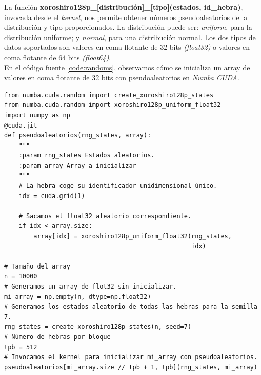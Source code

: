 La función \textbf{xoroshiro128p\_[distribución]\_[tipo](estados, id\_hebra)}, invocada desde el \textit{kernel}, nos permite obtener números pseudoaleatorios de la distribución y tipo proporcionados. La distribución puede ser: \textit{uniform}, para la distribución uniforme; y \textit{normal}, para una distribución normal. Los dos tipos de datos soportados son valores en coma flotante de 32 bits \textit{(float32)} o valores en coma flotante de 64 bits \textit{(float64)}. \\

En el código fuente \ref{code:randoms}, observamos cómo se inicializa un array de valores en coma flotante de 32 bits con pseudoaleatorios en \textit{Numba CUDA}.

\begin{code}
\begin{verbatim}
from numba.cuda.random import create_xoroshiro128p_states
from numba.cuda.random import xoroshiro128p_uniform_float32
import numpy as np
@cuda.jit
def pseudoaleatorios(rng_states, array):
    """
    :param rng_states Estados aleatorios.
    :param array Array a inicializar
    """
    # La hebra coge su identificador unidimensional único.
    idx = cuda.grid(1)

    # Sacamos el float32 aleatorio correspondiente.
    if idx < array.size:
        array[idx] = xoroshiro128p_uniform_float32(rng_states,
                                                   idx)

# Tamaño del array
n = 10000
# Generamos un array de flot32 sin inicializar.
mi_array = np.empty(n, dtype=np.float32)
# Generamos los estados aleatorio de todas las hebras para la semilla 7.
rng_states = create_xoroshiro128p_states(n, seed=7)
# Número de hebras por bloque
tpb = 512
# Invocamos el kernel para inicializar mi_array con pseudoaleatorios.
pseudoaleatorios[mi_array.size // tpb + 1, tpb](rng_states, mi_array)
\end{verbatim}
\label{code:randoms}
\end{code}


